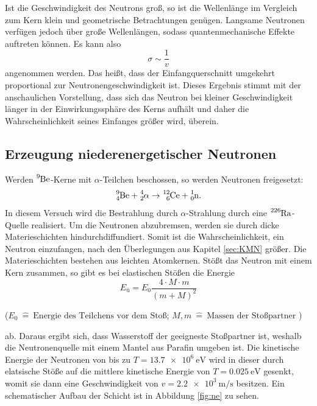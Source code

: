 Ist die Geschwindigkeit des Neutrons groß, so ist die Wellenlänge im Vergleich zum Kern klein und geometrische Betrachtungen  genügen. Langsame Neutronen verfügen jedoch
über große Wellenlängen, sodass quantenmechanische Effekte auftreten können.
Es kann also
\begin{equation}
  \sigma \sim \frac{1}{v}
\end{equation}
angenommen werden.
Das heißt, dass der Einfangquerschnitt umgekehrt proportional zur Neutronengeschwindigkeit ist. Dieses Ergebnis stimmt mit der anschaulichen Vorstellung, dass sich
das Neutron bei kleiner Geschwindigkeit länger in der Einwirkungssphäre des Kerns aufhält und daher die Wahrscheinlichkeit seines Einfanges größer wird, überein.

\subsection{Erzeugung niederenergetischer Neutronen}
Werden $\ce{^{9}_{}Be}$-Kerne mit $\alpha$-Teilchen beschossen, so werden Neutronen freigesetzt:
\begin{equation}
  \ce{^{9}_{4}Be} + \ce{^{4}_{2}}\alpha \rightarrow \ce{^{12}_{6}Ce}+\ce{^{1}_{0}n} \text{.}
\end{equation}
In diesem Versuch wird die Bestrahlung durch $\alpha$-Strahlung durch eine $\ce{^{226}_{}Ra}$-Quelle realisiert.
Um die Neutronen abzubremsen, werden sie durch dicke Materieschichten hindurchdiffundiert. Somit ist die Wahrscheinlichkeit, ein Neutron einzufangen, nach den Überlegungen aus Kapitel \ref{sec:KMN} größer.
Die Materieschichten bestehen aus leichten Atomkernen.
Stößt das Neutron mit einem Kern zusammen, so gibt es bei elastischen Stößen die Energie
\begin{equation}
  E_ü=E_0 \frac{4 \cdot M \cdot m}{\left(m+M \right)^2}
\end{equation}
\begin{center}
 \small {($E_0\: \hat{=} \: \text{Energie des Teilchens vor dem Stoß}$; $M, m \: \hat{=} \: \text{Massen der Stoßpartner}$ )}
\end{center}
ab. Daraus ergibt sich, dass Wasserstoff der geeigneste Stoßpartner ist, weshalb die Neutronenquelle mit einem Mantel aus Parafin umgeben ist.
Die kinetische Energie der Neutronen  von bis zu $T=\SI{13,7e6}{\electronvolt}$ wird in dieser durch elatsische Stöße
auf die mittlere kinetische Energie von
$T=\SI{0,025}{\electronvolt}$ gesenkt, womit sie dann eine Geschwindigkeit von $v=\SI{2,2e3}{\metre\per\second}$ besitzen.
Ein schematischer Aufbau der Schicht ist in Abbildung \ref{fig:ne} zu sehen.
